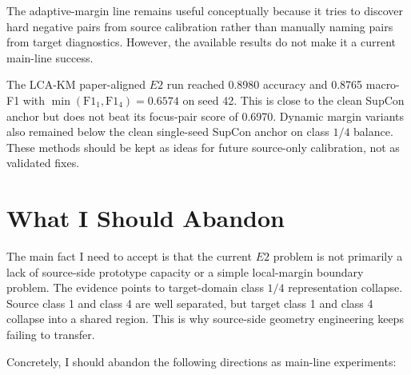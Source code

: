 \documentclass[11pt]{article}
\begin{document}
The adaptive-margin line remains useful conceptually because it tries to discover hard negative pairs from source calibration rather than manually naming pairs from target diagnostics. However, the available results do not make it a current main-line success.

The LCA-KM paper-aligned $E2$ run reached 0.8980 accuracy and 0.8765 macro-F1 with $\min(\mathrm{F1}_1,\mathrm{F1}_4)=0.6574$ on seed 42. This is close to the clean SupCon anchor but does not beat its focus-pair score of 0.6970. Dynamic margin variants also remained below the clean single-seed SupCon anchor on class $1/4$ balance. These methods should be kept as ideas for future source-only calibration, not as validated fixes.

\section{What I Should Abandon}

The main fact I need to accept is that the current $E2$ problem is not primarily a lack of source-side prototype capacity or a simple local-margin boundary problem. The evidence points to target-domain class $1/4$ representation collapse. Source class 1 and class 4 are well separated, but target class 1 and class 4 collapse into a shared region. This is why source-side geometry engineering keeps failing to transfer.

Concretely, I should abandon the following directions as main-line experiments:
\end{document}
